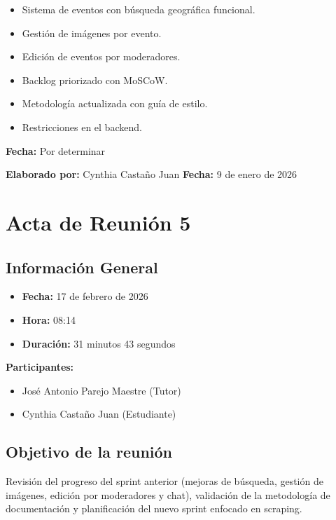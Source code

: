 \begin{itemize}
    \item Sistema de eventos con búsqueda geográfica funcional.
    \item Gestión de imágenes por evento.
    \item Edición de eventos por moderadores.
    \item Backlog priorizado con MoSCoW.
    \item Metodología actualizada con guía de estilo.
    \item Restricciones en el backend.
\end{itemize}

\textbf{Fecha:} Por determinar

\textbf{Elaborado por:} Cynthia Castaño Juan \hfill \textbf{Fecha:} 9 de enero de 2026

\newpage

\section*{Acta de Reunión 5}

\subsection*{Información General}
\begin{itemize}
    \item \textbf{Fecha:} 17 de febrero de 2026
    \item \textbf{Hora:} 08:14
    \item \textbf{Duración:} 31 minutos 43 segundos
\end{itemize}

\textbf{Participantes:}
\begin{itemize}
    \item José Antonio Parejo Maestre (Tutor)
    \item Cynthia Castaño Juan (Estudiante)
\end{itemize}

\subsection*{Objetivo de la reunión}
Revisión del progreso del sprint anterior (mejoras de búsqueda, gestión de imágenes, edición por moderadores y chat), validación de la metodología de documentación y planificación del nuevo sprint enfocado en scraping.

